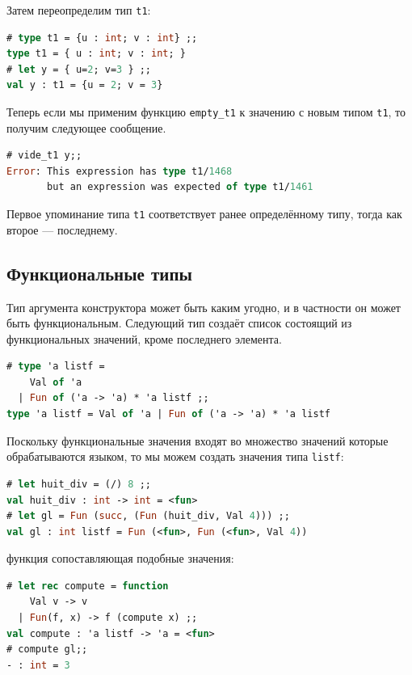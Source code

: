 Затем переопределим тип \texttt{t1}:

\begin{lstlisting}[language=OCaml]
# type t1 = {u : int; v : int} ;;
type t1 = { u : int; v : int; }
# let y = { u=2; v=3 } ;;
val y : t1 = {u = 2; v = 3}
\end{lstlisting}

Теперь если мы применим функцию \texttt{empty\_t1} к значению с новым типом
\texttt{t1}, то получим следующее сообщение.

\begin{lstlisting}[language=OCaml]
# vide_t1 y;;
Error: This expression has type t1/1468
       but an expression was expected of type t1/1461
\end{lstlisting}

Первое упоминание типа \texttt{t1} соответствует ранее определённому типу, тогда
как второе --- последнему.

\subsection{Функциональные типы}

Тип аргумента конструктора может быть каким угодно, и в частности он может быть
функциональным. Следующий тип создаёт список состоящий из функциональных
значений, кроме последнего элемента.

\begin{lstlisting}[language=OCaml]
# type 'a listf =
    Val of 'a
  | Fun of ('a -> 'a) * 'a listf ;;
type 'a listf = Val of 'a | Fun of ('a -> 'a) * 'a listf
\end{lstlisting}

Поскольку функциональные значения входят во множество значений которые
обрабатываются языком, то мы можем создать значения типа \texttt{listf}:

\begin{lstlisting}[language=OCaml]
# let huit_div = (/) 8 ;;
val huit_div : int -> int = <fun>
# let gl = Fun (succ, (Fun (huit_div, Val 4))) ;;
val gl : int listf = Fun (<fun>, Fun (<fun>, Val 4))
\end{lstlisting}

функция сопоставляющая подобные значения:

\begin{lstlisting}[language=OCaml]
# let rec compute = function
    Val v -> v
  | Fun(f, x) -> f (compute x) ;;
val compute : 'a listf -> 'a = <fun>
# compute gl;;
- : int = 3
\end{lstlisting}

